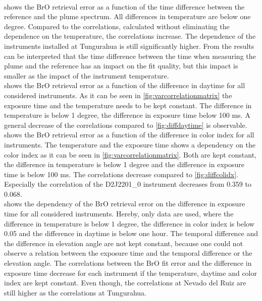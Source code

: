 \documentclass  [
  paper    = a4,
  BCOR     = 10mm,
  twoside,
  fontsize = 12pt,
  fleqn,
  toc      = bibnumbered,
  toc      = listofnumbered,
  numbers  = noendperiod,
  headings = normal,
  listof   = leveldown,
  version  = 3.03
]                                       {scrreprt}
\begin{document}
\\
 shows the BrO retrieval error as a function of the time difference between the reference and the plume spectrum. All differences in temperature are below one degree. Compared to the correlations, calculated without eliminating the dependence on the temperature, the correlations increase. The dependence of the instruments installed at Tungurahua is still significantly higher. From the results can be interpreted that the time difference between the time when measuring the plume and the reference has an impact on the fit quality, but this impact is smaller as the impact of the instrument temperature.\\
 shows the BrO retrieval error as a function of the difference in daytime for all considered instruments. As it can be seen in \cref{fig:varcorrelationmatrix} the exposure time and the temperature needs to be kept constant. The difference in temperature is below 1 degree, the difference in exposure time below 100 ms. A general decrease of the correlations compared to \cref{fig:diffdaytime} is observable.\\
%
 shows the BrO retrieval error as a function of the difference in color index for all instruments. The temperature and the exposure time shows a dependency on the color index as it can be seen in \cref{fig:varcorrelationmatrix}. Both are kept constant, the difference in temperature is below 1 degree and the difference in exposure time is below 100 ms. The correlations decrease compared to \cref{fig:diffcolidx}. Especially the correlation of the D2J2201\_0 instrument decreases from 0.359 to 0.068.\\
%
 shows the dependency of the BrO retrieval error on the difference in exposure time for all considered instruments. Hereby, only data are used, where the difference in temperature is below 1 degree, the difference in color index is below 0.05 and the difference in daytime is below one hour. The temporal difference and the difference in elevation angle are not kept constant, because one could not observe a relation between the exposure time and the temporal difference or the elevation angle. The correlations between the BrO fit error and the difference in exposure time decrease for each instrument if the temperature, daytime and color index are kept constant. Even though, the correlations at Nevado del Ruiz are still higher as the correlations at Tungurahua.\\
\end{document}
